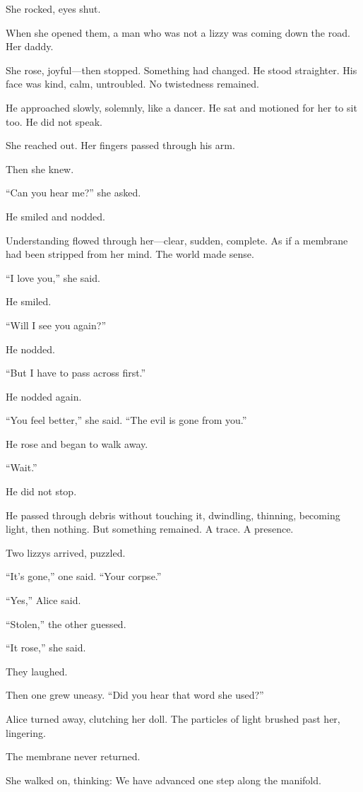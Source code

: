 She rocked, eyes shut.

When she opened them, a man who was not a lizzy was coming down the road. Her daddy.

She rose, joyful—then stopped. Something had changed. He stood straighter. His face was kind, calm, untroubled. No twistedness remained.

He approached slowly, solemnly, like a dancer. He sat and motioned for her to sit too. He did not speak.

She reached out. Her fingers passed through his arm.

Then she knew.

“Can you hear me?” she asked.

He smiled and nodded.

Understanding flowed through her—clear, sudden, complete. As if a membrane had been stripped from her mind. The world made sense.

“I love you,” she said.

He smiled.

“Will I see you again?”

He nodded.

“But I have to pass across first.”

He nodded again.

“You feel better,” she said. “The evil is gone from you.”

He rose and began to walk away.

“Wait.”

He did not stop.

He passed through debris without touching it, dwindling, thinning, becoming light, then nothing. But something remained. A trace. A presence.

Two lizzys arrived, puzzled.

“It’s gone,” one said. “Your corpse.”

“Yes,” Alice said.

“Stolen,” the other guessed.

“It rose,” she said.

They laughed.

Then one grew uneasy. “Did you hear that word she used?”

Alice turned away, clutching her doll. The particles of light brushed past her, lingering.

The membrane never returned.

She walked on, thinking: We have advanced one step along the manifold.

